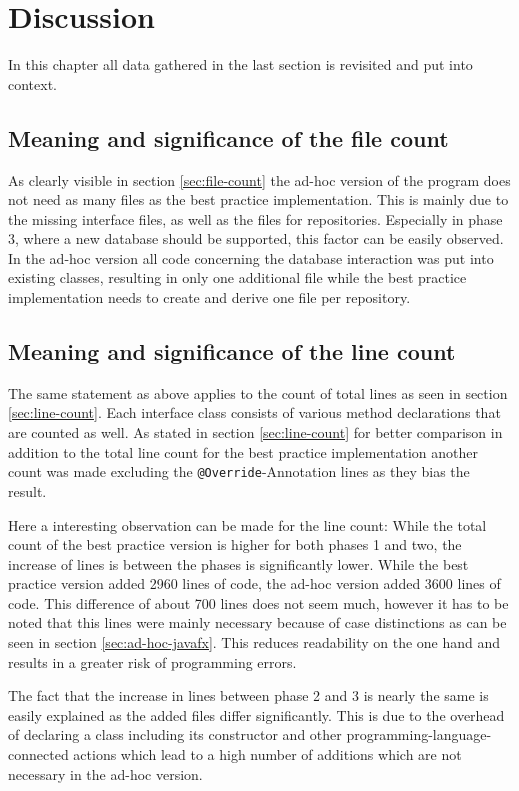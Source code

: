 \chapter{Discussion}
\label{sec:discussion}
In this chapter all data gathered in the last section is revisited and put into context. 
\section{Meaning and significance of the file count}
As clearly visible in section \ref{sec:file-count} the ad-hoc version of the program does not need as many files as the best practice implementation. This is mainly due to the missing interface files, as well as the files for repositories. Especially in phase 3, where a new database should be supported, this factor can be easily observed. In the ad-hoc version all code concerning the database interaction was put into existing classes, resulting in only one additional file while the best practice implementation needs to create and derive one file per repository. 

\section{Meaning and significance of the line count}
The same statement as above applies to the count of total lines as seen in section \ref{sec:line-count}. Each interface class consists of various method declarations that are counted as well. As stated in section \ref{sec:line-count} for better comparison in addition to the total line count for the best practice implementation another count was made excluding the \texttt{@Override}-Annotation lines as they bias the result. 

Here a interesting observation can be made for the line count: While the total count of the best practice version is higher for both phases 1 and two, the increase of lines is between the phases is significantly lower. While the best practice version added 2960 lines of code, the ad-hoc version added 3600 lines of code. This difference of about 700 lines does not seem much, however it has to be noted that this lines were mainly necessary because of case distinctions as can be seen in section \ref{sec:ad-hoc-javafx}. This reduces readability on the one hand and results in a greater risk of programming errors. 

The fact that the increase in lines between phase 2 and 3 is nearly the same is easily explained as the added files differ significantly. This is due to the overhead of declaring a class including its constructor and other programming-language-connected actions which lead to a high number of additions which are not necessary in the ad-hoc version.

